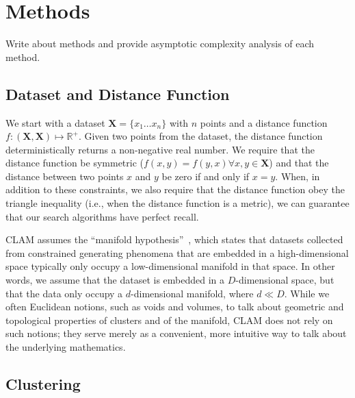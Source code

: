 \section{Methods}
\label{sec:methods}

Write about methods and provide asymptotic complexity analysis of each method.

\subsection{Dataset and Distance Function}
\label{subsec:methods:dataset-and-distance-function}

We start with a dataset $\textbf{X} = \{x_1 \dots x_n\}$ with $n$ points and a distance function $f : (\textbf{X}, \textbf{X}) \mapsto \mathbb{R}^+$.
Given two points from the dataset, the distance function deterministically returns a non-negative real number. We require that the distance function be symmetric ($f(x, y) = f(y, x) \forall x, y \in \textbf{X}$) and 
that the distance between two points $x$ and $y$ be zero if and only if $x = y$. When, in addition to these constraints, we also require that the distance function obey 
the triangle inequality (i.e., when the distance function is a metric), we can guarantee that our search algorithms have perfect recall. 

CLAM assumes the ``manifold hypothesis''~\cite{fefferman2016testing}, which states that datasets collected from constrained generating phenomena that are embedded in a high-dimensional space typically only occupy a low-dimensional manifold in that space.
In other words, we assume that the dataset is embedded in a $D$-dimensional space, but that the data only occupy a $d$-dimensional manifold, where $d \ll D$. While we often Euclidean notions, such as voids and volumes, to talk about geometric and topological 
properties of clusters and of the manifold, CLAM does not rely on such notions; they serve merely as a convenient, more intuitive way to talk about the underlying mathematics.

\subsection{Clustering}
\label{subsec:methods:clustering}

